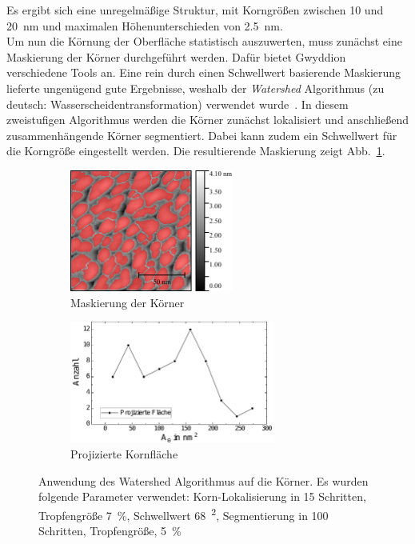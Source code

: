 \documentclass[a4paper,twoside,final]{article}
\begin{document}
Es ergibt sich eine unregelmäßige Struktur, mit Korngrößen zwischen 10 und \SI{20}{\nano\metre} und maximalen Höhenunterschieden von \SI{2.5}{\nano\metre}.\\
Um nun die Körnung der Oberfläche statistisch auszuwerten, muss zunächst eine Maskierung der Körner durchgeführt werden. Dafür bietet Gwyddion verschiedene Tools an. Eine rein durch einen Schwellwert basierende Maskierung lieferte ungenügend gute Ergebnisse, weshalb der \textit{Watershed} Algorithmus (zu deutsch: Wasserscheidentransformation) verwendet wurde~\cite{Gwyddion_documentation}. In diesem zweistufigen Algorithmus werden die Körner zunächst lokalisiert und anschließend zusammenhängende Körner segmentiert. Dabei kann zudem ein Schwellwert für die Korngröße eingestellt werden. Die resultierende Maskierung zeigt Abb.~\ref{fig:Kornflaechen}.
\begin{figure}[htp]
    \centering
    \begin{subfigure}{0.45\textwidth}
        \includegraphics[height=4cm]{Bilder/Image01963_Korngroessen.pdf}
        \caption{Maskierung der Körner}
    \end{subfigure}
    \hspace{0.5cm}
    \begin{subfigure}{0.45\textwidth}
        \includegraphics[height=4cm]{Bilder/Image01963_ProjizierteFlaeche.pdf}
        \caption{Projizierte Kornfläche}
    \end{subfigure}
    \caption{Anwendung des Watershed Algorithmus auf die Körner. Es wurden folgende Parameter verwendet: Korn-Lokalisierung in 15 Schritten, Tropfengröße \SI{7}{\percent}, Schwellwert \SI{68}{\squared}, Segmentierung in 100 Schritten, Tropfengröße, \SI{5}{\percent}}
    \label{fig:Kornflaechen}
\end{figure}\\
\end{document}

